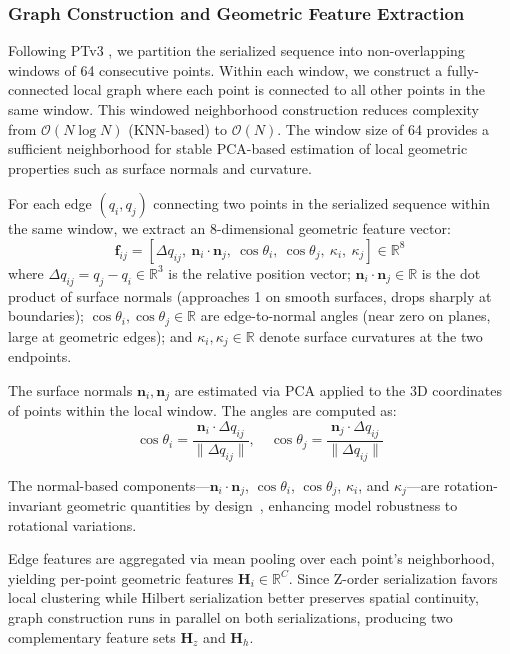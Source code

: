 \documentclass[a4paper,fleqn]{cas-sc}
\begin{document}
\subsubsection{Graph Construction and Geometric Feature Extraction}

Following PTv3 \cite{ptv3}, we partition the serialized sequence into non-overlapping windows of 64 consecutive points. Within each window, we construct a fully-connected local graph where each point is connected to all other points in the same window. This windowed neighborhood construction reduces complexity from $\mathcal{O}(N\log N)$ (KNN-based) to $\mathcal{O}(N)$. The window size of 64 provides a sufficient neighborhood for stable PCA-based estimation of local geometric properties such as surface normals and curvature.

For each edge $(q_i, q_j)$ connecting two points in the serialized sequence within the same window, we extract an 8-dimensional geometric feature vector:
\begin{equation}
	\mathbf{f}_{ij} = [\Delta q_{ij},\ \mathbf{n}_i \cdot \mathbf{n}_j,\ \cos\theta_i,\ \cos\theta_j,\ \kappa_i,\ \kappa_j] \in \mathbb{R}^8
\end{equation}
where $\Delta q_{ij} = q_j - q_i \in \mathbb{R}^3$ is the relative position vector; $\mathbf{n}_i \cdot \mathbf{n}_j \in \mathbb{R}$ is the dot product of surface normals (approaches 1 on smooth surfaces, drops sharply at boundaries); $\cos\theta_i, \cos\theta_j \in \mathbb{R}$ are edge-to-normal angles (near zero on planes, large at geometric edges); and $\kappa_i, \kappa_j \in \mathbb{R}$ denote surface curvatures at the two endpoints.

The surface normals $\mathbf{n}_i, \mathbf{n}_j$ are estimated via PCA applied to the 3D coordinates of points within the local window. The angles are computed as:
\begin{equation}
	\cos\theta_i = \frac{\mathbf{n}_i \cdot \Delta q_{ij}}{\|\Delta q_{ij}\|}, \quad \cos\theta_j = \frac{\mathbf{n}_j \cdot \Delta q_{ij}}{\|\Delta q_{ij}\|}
\end{equation}

The normal-based components—$\mathbf{n}_i \cdot \mathbf{n}_j$, $\cos\theta_i$, $\cos\theta_j$, $\kappa_i$, and $\kappa_j$—are rotation-invariant geometric quantities by design~\cite{clusterNet, riconv}, enhancing model robustness to rotational variations.

Edge features are aggregated via mean pooling over each point's neighborhood, yielding per-point geometric features $\mathbf{H}_i \in \mathbb{R}^C$. Since Z-order serialization favors local clustering while Hilbert serialization better preserves spatial continuity, graph construction runs in parallel on both serializations, producing two complementary feature sets $\mathbf{H}_z$ and $\mathbf{H}_h$.
\end{document}
